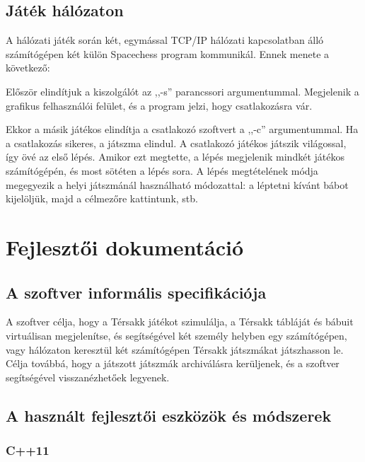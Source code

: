 \documentclass[12pt, twoside]{report}
\begin{document}
\section{Játék hálózaton}

A hálózati játék során két, egymással TCP/IP hálózati kapcsolatban álló számítógépen két külön Spacechess program kommunikál. Ennek menete a következő:

Először elindítjuk a kiszolgálót az ,,-s'' parancssori argumentummal. Megjelenik a grafikus felhasználói felület, és a program jelzi, hogy csatlakozásra vár.

Ekkor a másik játékos elindítja a csatlakozó szoftvert a ,,-c'' argumentummal. Ha a csatlakozás sikeres, a játszma elindul. A csatlakozó játékos játszik világossal, így övé az első lépés. Amikor ezt megtette, a lépés megjelenik mindkét játékos számítógépén, és most sötéten a lépés sora. A lépés megtételének módja megegyezik a helyi játszmánál használható módozattal: a léptetni kívánt bábot kijelöljük, majd a célmezőre kattintunk, stb.

\chapter{Fejlesztői dokumentáció}

\section{A szoftver informális specifikációja}

A szoftver célja, hogy a Térsakk játékot szimulálja, a Térsakk tábláját és bábuit virtuálisan megjelenítse, és segítségével két személy helyben egy számítógépen, vagy hálózaton keresztül két számítógépen Térsakk játszmákat játszhasson le. Célja továbbá, hogy a játszott játszmák archiválásra kerüljenek, és a szoftver segítségével vissza\-néz\-he\-tő\-ek legyenek.



\section{A használt fejlesztői eszközök és módszerek}

\subsection{C++11}
\end{document}
